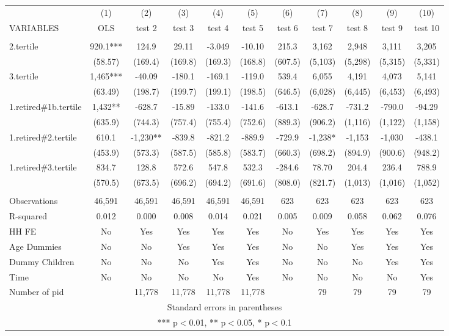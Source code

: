 \begin{tabular}{lcccccccccc} \hline
 & (1) & (2) & (3) & (4) & (5) & (6) & (7) & (8) & (9) & (10) \\
VARIABLES & OLS & test 2 & test 3 & test 4 & test 5 & test 6 & test 7 & test 8 & test 9 & test 10 \\ \hline
 &  &  &  &  &  &  &  &  &  &  \\
2.tertile & 920.1*** & 124.9 & 29.11 & -3.049 & -10.10 & 215.3 & 3,162 & 2,948 & 3,111 & 3,205 \\
 & (58.57) & (169.4) & (169.8) & (169.3) & (168.8) & (607.5) & (5,103) & (5,298) & (5,315) & (5,331) \\
3.tertile & 1,465*** & -40.09 & -180.1 & -169.1 & -119.0 & 539.4 & 6,055 & 4,191 & 4,073 & 5,141 \\
 & (63.49) & (198.7) & (199.7) & (199.1) & (198.5) & (646.5) & (6,028) & (6,445) & (6,453) & (6,493) \\
1.retired\#1b.tertile & 1,432** & -628.7 & -15.89 & -133.0 & -141.6 & -613.1 & -628.7 & -731.2 & -790.0 & -94.29 \\
 & (635.9) & (744.3) & (757.4) & (755.4) & (752.6) & (889.3) & (906.2) & (1,116) & (1,122) & (1,158) \\
1.retired\#2.tertile & 610.1 & -1,230** & -839.8 & -821.2 & -889.9 & -729.9 & -1,238* & -1,153 & -1,030 & -438.1 \\
 & (453.9) & (573.3) & (587.5) & (585.8) & (583.7) & (660.3) & (698.2) & (894.9) & (900.6) & (948.2) \\
1.retired\#3.tertile & 834.7 & 128.8 & 572.6 & 547.8 & 532.3 & -284.6 & 78.70 & 204.4 & 236.4 & 788.9 \\
 & (570.5) & (673.5) & (696.2) & (694.2) & (691.6) & (808.0) & (821.7) & (1,013) & (1,016) & (1,052) \\
 &  &  &  &  &  &  &  &  &  &  \\
Observations & 46,591 & 46,591 & 46,591 & 46,591 & 46,591 & 623 & 623 & 623 & 623 & 623 \\
R-squared & 0.012 & 0.000 & 0.008 & 0.014 & 0.021 & 0.005 & 0.009 & 0.058 & 0.062 & 0.076 \\
HH FE & No & Yes & Yes & Yes & Yes & No & Yes & Yes & Yes & Yes \\
Age Dummies & No & No & Yes & Yes & Yes & No & No & Yes & Yes & Yes \\
Dummy Children & No & No & No & Yes & Yes & No & No & No & Yes & Yes \\
Time & No & No & No & No & Yes & No & No & No & No & Yes \\
 Number of pid &  & 11,778 & 11,778 & 11,778 & 11,778 &  & 79 & 79 & 79 & 79 \\ \hline
\multicolumn{11}{c}{ Standard errors in parentheses} \\
\multicolumn{11}{c}{ *** p$<$0.01, ** p$<$0.05, * p$<$0.1} \\
\end{tabular}
